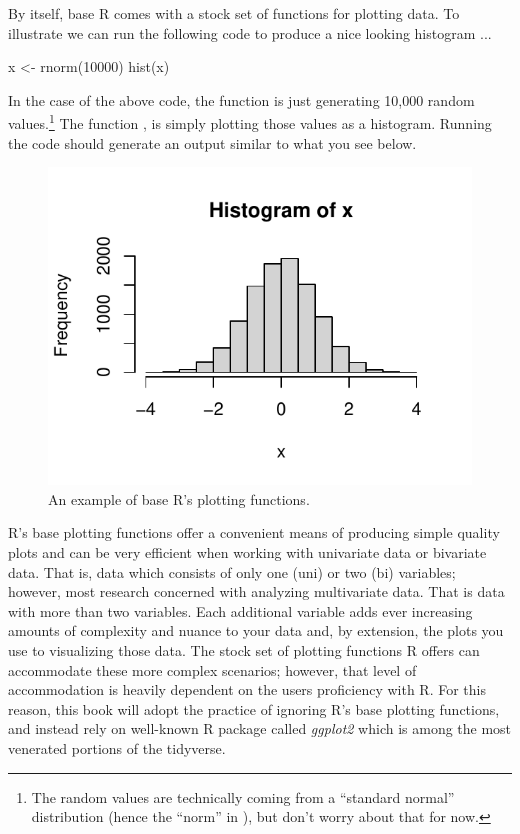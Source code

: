 By itself, base R comes with a stock set of functions for plotting data. To illustrate we can run the following code to produce a nice looking histogram ...

\begin{inR}
x <- rnorm(10000)
hist(x)
\end{inR}
\vspace{1em}

\noindent
In the case of the above code, the function  is just generating 10,000 random values.\footnote{The random values are technically coming from a ``standard normal'' distribution (hence the ``norm'' in ), but don't worry about that for now.} The function , is simply plotting those values as a histogram.  Running the code should generate an output similar to what you see below.

\begin{figure}[H]
\centering
\includegraphics[scale = 0.75, trim={0 5mm 0 0},clip]{graphics/ch2Figs/base_hist.pdf}
\caption{An example of base R's plotting functions.}
\label{fig:base_hist}
\end{figure}

R's base plotting functions offer a convenient means of producing simple quality plots and can be very efficient when working with \gls{univariate data} or \gls{bivariate data}.  That is, data which consists of only one (uni) or two (bi) variables; however, most research concerned with analyzing \gls{multivariate data}. That is data with more than two variables. Each additional variable adds ever increasing amounts of complexity and nuance to your data and, by extension, the plots you use to visualizing those data.  The stock set of plotting functions R offers can accommodate these more complex scenarios; however, that level of accommodation is heavily dependent on the users proficiency with R.  For this reason, this book will adopt the practice of ignoring R's base plotting functions, and instead rely on well-known R package called \textit{ggplot2} which is among the most venerated portions of the tidyverse.   

